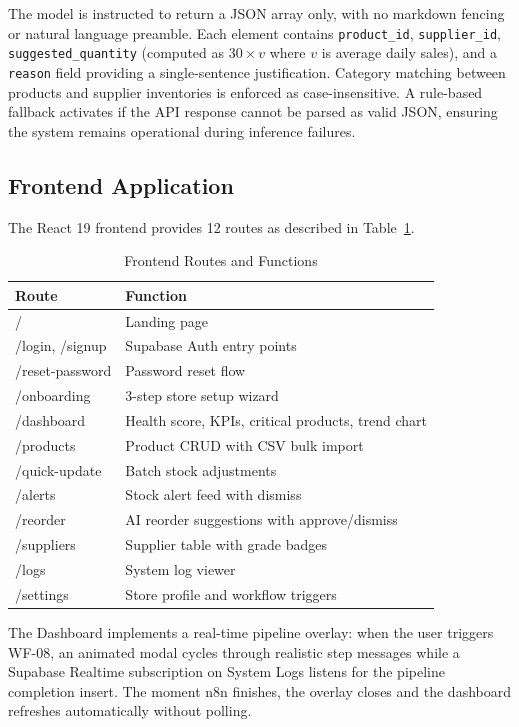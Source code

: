 \documentclass[journal]{IEEEtran}
\begin{document}
The model is instructed to return a JSON array only, 
with no markdown fencing or natural language preamble. 
Each element contains \texttt{product\_id}, 
\texttt{supplier\_id}, \texttt{suggested\_quantity} 
(computed as $30 \times v$ where $v$ is average daily 
sales), and a \texttt{reason} field providing a 
single-sentence justification. Category matching between 
products and supplier inventories is enforced as 
case-insensitive. A rule-based fallback activates 
if the API response cannot be parsed as valid JSON, 
ensuring the system remains operational during 
inference failures.

\subsection{Frontend Application}

The React 19 frontend provides 12 routes as described in Table~\ref{tab:routes}.

\begin{table}[htbp]
\centering
\caption{Frontend Routes and Functions}
\label{tab:routes}
\begin{tabular}{p{2.2cm}p{5.5cm}}
\toprule
\textbf{Route} & \textbf{Function} \\
\midrule
/ & Landing page \\
/login, /signup & Supabase Auth entry points \\
/reset-password & Password reset flow \\
/onboarding & 3-step store setup wizard \\
/dashboard & Health score, KPIs, critical products, trend chart \\
/products & Product CRUD with CSV bulk import \\
/quick-update & Batch stock adjustments \\
/alerts & Stock alert feed with dismiss \\
/reorder & AI reorder suggestions with approve/dismiss \\
/suppliers & Supplier table with grade badges \\
/logs & System log viewer \\
/settings & Store profile and workflow triggers \\
\bottomrule
\end{tabular}
\end{table}

The Dashboard implements a real-time pipeline overlay: when the user triggers WF-08, an animated modal cycles through realistic step messages while a Supabase Realtime subscription on System Logs listens for the pipeline completion insert. The moment n8n finishes, the overlay closes and the dashboard refreshes automatically without polling.
\end{document}

